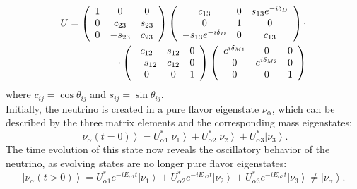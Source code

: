     \begin{equation}
	\centering
	\begin{split}
     U = \left(
	\begin{array}{ccc}
      	1 & 0 & 0\\
      	0 & c_{23} & s_{23}\\
      	0 & -s_{23} & c_{23}\\
   	\end{array}
	\right)
	\left(
	\begin{array}{ccc}
      	c_{13} & 0 & s_{13}e^{-i\delta_D}\\
      	0 & 1 & 0\\
      	-s_{13}e^{-i\delta_D} & 0 & c_{13}\\
      	\end{array}
	\right)\cdot\\
	\cdot\left(
	\begin{array}{ccc}
      	c_{12} & s_{12} & 0\\
      	-s_{12} & c_{12} & 0\\
      	0 & 0 & 1\\
      	\end{array}
	\right)
		\left(
	\begin{array}{ccc}
      	e^{i\delta_{M1}} & 0 & 0\\
      	0 & e^{i\delta_{M2}} & 0\\
      	0 & 0 & 1\\
      	\end{array}
	\right)
	\end{split}
    \end{equation}
    where $c_{ij}=\cos{\theta_{ij}}$ and $s_{ij}=\sin{\theta_{ij}}$.\\
	Initially, the neutrino is created in a pure flavor eigenstate $\nu_{\alpha}$, which can be described by the three matrix elements and the corresponding mass eigenstates:
	\begin{equation}
		\left|\nu_\alpha(t=0)\right> = U^*_{\alpha1} \left|\nu_1\right> + U^*_{\alpha2} \left|\nu_2\right> + U^*_{\alpha3} \left|\nu_3\right>.
	\end{equation}
	The time evolution of this state now reveals the oscillatory behavior of the neutrino, as evolving states are no longer pure flavor eigenstates:
	\begin{equation}
		\left|\nu_\alpha(t>0)\right> = U^*_{\alpha1} e^{-iE_{\alpha1}t}\left|\nu_1\right> + U^*_{\alpha2} e^{-iE_{\alpha2}t}\left|\nu_2\right> + U^*_{\alpha3}e^{-iE_{\alpha3}t} \left|\nu_3\right> \neq \left|\nu_\alpha\right>.
	\end{equation}
